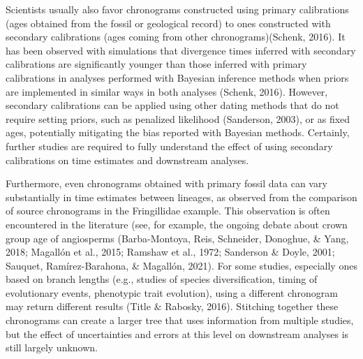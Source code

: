 \documentclass[
  english,
  man]{apa6}
\begin{document}
Scientists usually also favor chronograms constructed using primary calibrations (ages obtained from the fossil or geological record) to ones constructed with secondary calibrations (ages coming from other chronograms)(Schenk, 2016). It has been observed with simulations that divergence times inferred with secondary calibrations are significantly younger than those inferred with primary calibrations in analyses performed with Bayesian inference methods when priors are implemented in similar ways in both analyses (Schenk, 2016). However, secondary calibrations
can be applied using other dating methods that do not require setting priors, such as penalized likelihood (Sanderson, 2003), or as fixed ages,
potentially mitigating the bias reported with Bayesian methods.
Certainly, further studies are required to fully understand the effect of using secondary calibrations on time estimates and downstream analyses.

Furthermore, even chronograms obtained with primary fossil data can vary substantially in time estimates between lineages, as observed from the comparison of source chronograms in the Fringillidae example.
This observation is often encountered in the literature
(see, for example, the ongoing debate about crown group age of angiosperms (Barba-Montoya, Reis, Schneider, Donoghue, \& Yang, 2018; Magallón et al., 2015; Ramshaw et al., 1972; Sanderson \& Doyle, 2001; Sauquet, Ramírez-Barahona, \& Magallón, 2021). For some studies, especially ones based on branch lengths (e.g., studies of species diversification, timing of evolutionary events, phenotypic trait evolution), using a different chronogram may return different results (Title \& Rabosky, 2016). Stitching together these chronograms can create a larger tree that uses information from multiple studies, but the effect of uncertainties and errors at this level on downstream analyses is still largely unknown.
\end{document}
